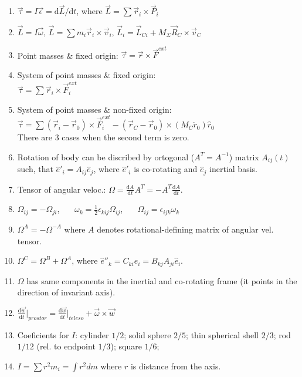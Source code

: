 \documentclass{article}
\renewcommand\d{\mathrm d}
\begin{document}
\begin{multicols}{3}
\begin{enumerate}
    \end{enumerate}


    \begin{enumerate}
        \item $\vec\tau =I\vec\epsilon=\d\vec L/\d t$, where $\vec L=\sum\vec r_i\times\vec P_i$
        \item $\vec L=I\vec\omega$, $\vec L=\sum m_i\vec r_i\times\vec v_i$, $\vec L_i=\vec L_{Ci}+M_\Sigma\vec R_C\times\vec v_C$
        \item Point masses \& fixed origin: $\vec\tau=\vec r\times\vec F^{ext}$
        \item System of point masses \& fixed origin:\\ $\vec\tau=\sum\vec r_i \times\vec F_i^{ext}$
        \item System of point masses \& non-fixed origin:\\$\vec\tau=\sum(\vec r_i-\vec r_0)\times\vec F_i^{ext}-(\vec r_C-\vec r_0)\times (M_C \ddot r_0)\hat r_0$\\There are 3 cases when the second term is zero.
        \item Rotation of body can be discribed by ortogonal ($A^T=A^{-1}$) matrix $A_{ij}(t)$ such, that $\hat e'_i=A_{ij}\hat e_j$, where $\hat e'_i$ is co-rotating and $\hat e_j$ inertial basis.
        \item Tensor of angular veloc.: $\Omega=\frac{\d A}{\d t}A^T=-A^T\frac{\d A}{\d t}$.
        \item $\Omega_{ij}=-\Omega_{ji}$,~~~ $\omega_k=\frac{1}{2}\epsilon_{kij}\Omega_{ij}$,~~~ $\Omega_{ij}=\epsilon_{ijk}\omega_k$
        \item $\Omega^A=-\Omega^{-A}$ where $A$ denotes rotational-defining matrix of angular vel. tensor.
        \item $\Omega^C=\Omega^B+\Omega^A$, where $\hat e''_k=C_{ki}\hat e_i=B_{kj}A_{ji}\hat e_i$.
        \item $\Omega$ has same components in the inertial and co-rotating frame (it points in the direction of invariant axis).
        \item $\frac{\d\vec w}{\d t}\big\rvert_{prostor}=\frac{\d\vec w}{\d t}\big\rvert_{teleso}+\vec\omega\times\vec w$
        \item Coeficients for $I$: cylinder $1/2$; solid sphere $2/5$; thin spherical shell $2/3$; rod $1/12$ (rel. to endpoint $1/3$); square $1/6$;
        \item $I=\sum r^2 m_i=\int r^2 dm$ where $r$ is distance from the axis.\\

\end{enumerate}
\end{multicols}
\end{document}
